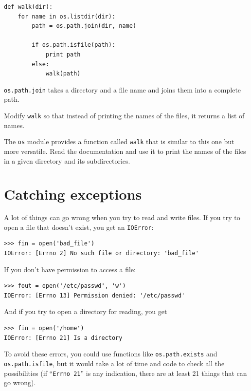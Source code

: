 \documentclass[10pt]{book}
\begin{document}

\beforeverb
\begin{verbatim}
def walk(dir):
    for name in os.listdir(dir):
        path = os.path.join(dir, name)

        if os.path.isfile(path):
            print path
        else:
            walk(path)
\end{verbatim}
\afterverb
%
{\tt os.path.join} takes a directory and a file name and joins
them into a complete path.  

\begin{ex}
Modify {\tt walk} so that instead of printing the names of
the files, it returns a list of names.
\end{ex}

\begin{ex}
The {\tt os} module provides a function called {\tt walk}
that is similar to this one but more versatile.  Read
the documentation and use it to print the names of the
files in a given directory and its subdirectories.
\end{ex}


\section{Catching exceptions}
\label{catch}

A lot of things can go wrong when you try to read and write
files.  If you try to open a file that doesn't exist, you get an
{\tt IOError}:


\beforeverb
\begin{verbatim}
>>> fin = open('bad_file')
IOError: [Errno 2] No such file or directory: 'bad_file'
\end{verbatim}
\afterverb
%
If you don't have permission to access a file:


\beforeverb
\begin{verbatim}
>>> fout = open('/etc/passwd', 'w')
IOError: [Errno 13] Permission denied: '/etc/passwd'
\end{verbatim}
\afterverb
%
And if you try to open a directory for reading, you get

\beforeverb
\begin{verbatim}
>>> fin = open('/home')
IOError: [Errno 21] Is a directory
\end{verbatim}
\afterverb
%
To avoid these errors, you could use functions like {\tt os.path.exists}
and {\tt os.path.isfile}, but it would take a lot of time and code
to check all the possibilities (if ``{\tt Errno 21}'' is any
indication, there are at least 21 things that can go wrong).
\end{document}

